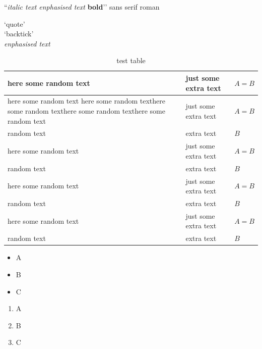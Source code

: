 \documentclass[12pt,onecolumn,a4paper,portrait]{article}
\begin{document}
``\textit{italic text \emph{enphasised text}} \textbf{bold}\rq\rq{} \textsf{sans serif} \textrm{roman}



\lq{}quote\rq{}\\

`backtick\rq{}\\




\emph{enphasised text}





\blindtext


\begin{table}[!t]

\centering

\begin{tabular}{|p{.3\linewidth}|p{.3\linewidth}|p{.2\linewidth}|}
\hline
here some random text & just some extra text& $A=B$\\
\hline
here some random text here some random texthere some random texthere some random texthere some random text& just some extra text& $A=B$\\
random text &  extra text& $B$\\
here some random text & just some extra text& $A=B$\\
random text &  extra text& $B$\\
here some random text & just some extra text& $A=B$\\
random text &  extra text& $B$\\
here some random text & just some extra text& $A=B$\\
random text &  extra text& $B$\\
\hline 
\end{tabular}
\caption{test table \label{tab:1}}

\end{table}

\blindtext





\begin{itemize}
\item A
\item B
\item C
\end{itemize}


\begin{enumerate}
\item A
\item B
\item C
\end{enumerate}
\end{document}
